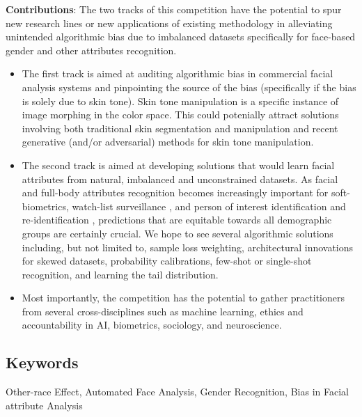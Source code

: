 \documentclass[11pt, oneside]{article}
\makeatletter
\let\@internalcite\cite
\def\cite{\def\citeauthoryear##1##2{##1, ##2}\@internalcite}
\makeatother
\begin{document}
{\bf Contributions}: The two tracks of this competition have the potential to 
spur new research lines or new applications of existing methodology in 
alleviating unintended algorithmic bias due to imbalanced datasets specifically 
for face-based gender and other attributes recognition. 
\begin{itemize}
	\item The first track is aimed at auditing algorithmic bias in commercial 
	facial analysis systems and pinpointing the source of the bias 
	(specifically if the bias is solely due to skin tone). Skin tone 
	manipulation is a specific instance of image morphing in the color space. 
	This could potenially attract solutions involving both traditional skin 
	segmentation and manipulation \cite{martinson2013identifying} and recent 
	generative (and/or adversarial) 
	methods for skin tone manipulation.
	\item The second track is aimed at developing solutions that would learn 
	facial attributes from natural, imbalanced and unconstrained datasets. As 
	facial and full-body attributes recognition \cite{bekele2017multi} becomes 
	increasingly important
	for soft-biometrics, watch-list surveillance  \cite{kamgar2011toward}, and
	person of interest identification and re-identification 
	\cite{best2014unconstrained}, predictions that are equitable towards all 
	demographic groups are certainly crucial. We hope to see several 
	algorithmic solutions including, but not limited to, sample loss weighting, 
	architectural innovations for skewed datasets, probability calibrations, 
	few-shot or single-shot recognition, and learning the tail distribution.
	\item Most importantly, the competition has the potential to gather 
	practitioners from several cross-disciplines such as machine learning, 
	ethics and accountability in AI, biometrics, sociology, and neuroscience.
\end{itemize}


\subsection{Keywords}
Other-race Effect, Automated Face Analysis, Gender Recognition, Bias in Facial
attribute Analysis
\end{document}
